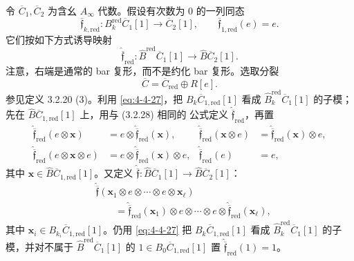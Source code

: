 令 $\overline C_1,\overline C_2$ 为含幺 $A_\infty$ 代数。假设有次数为
$0$ 的一列同态
\[
 \overline{\mathfrak f}_{k,\mathrm{red}}\colon
 B_k^{\mathrm{red}}\overline C_1[1]
 \longrightarrow\overline C_2[1],
 \qquad
 \overline{\mathfrak f}_{1,\mathrm{red}}(e)=e.
\]
它们按如下方式诱导映射
\begin{equation}
 \widehat{\overline{\mathfrak f}}_{\mathrm{red}}\colon
 \widehat B^{\mathrm{red}}\overline C_1[1]
 \longrightarrow\widehat B\overline C_2[1].
\tag{4.4.26}\label{eq:4-4-26}
\end{equation}
注意，右端是通常的 bar 复形，而不是约化 bar 复形。选取分裂
\begin{equation}
 \overline C=\overline C_{\mathrm{red}}\oplus R[e].
\tag{4.4.27}\label{eq:4-4-27}
\end{equation}
参见定义 3.2.20 (3)。利用 \eqref{eq:4-4-27}，把
$B_k\overline C_{1,\mathrm{red}}[1]$ 看成
$\widehat B_k^{\mathrm{red}}\overline C_1[1]$ 的子模；先在
$\widehat B\overline C_{1,\mathrm{red}}[1]$ 上，用与 (3.2.28) 相同的
公式定义 $\widehat{\overline{\mathfrak f}}_{\mathrm{red}}$，再置
\[
 \begin{aligned}
 \widehat{\overline{\mathfrak f}}_{\mathrm{red}}
 (e\otimes\mathbf x)
 &=e\otimes
 \widehat{\overline{\mathfrak f}}_{\mathrm{red}}(\mathbf x),&
 \widehat{\overline{\mathfrak f}}_{\mathrm{red}}
 (\mathbf x\otimes e)
 &=\widehat{\overline{\mathfrak f}}_{\mathrm{red}}(\mathbf x)
 \otimes e,\\
 \widehat{\overline{\mathfrak f}}_{\mathrm{red}}
 (e\otimes\mathbf x\otimes e)
 &=e\otimes
 \widehat{\overline{\mathfrak f}}_{\mathrm{red}}(\mathbf x)
 \otimes e,&
 \widehat{\overline{\mathfrak f}}_{\mathrm{red}}(e)&=e,
 \end{aligned}
\]
其中 $\mathbf x\in\widehat B\overline C_{1,\mathrm{red}}[1]$。又定义
$\widehat{\overline{\mathfrak f}}\colon
\widehat B\overline C_1[1]\to\widehat B\overline C_2[1]$：
\begin{equation}
 \begin{aligned}
 &\widehat{\overline{\mathfrak f}}
 (\mathbf x_1\otimes e\otimes\cdots\otimes e\otimes\mathbf x_\ell)\\
 &\qquad=
 \widehat{\overline{\mathfrak f}}_{\mathrm{red}}(\mathbf x_1)
 \otimes e\otimes\cdots\otimes e\otimes
 \widehat{\overline{\mathfrak f}}_{\mathrm{red}}(\mathbf x_\ell),
 \end{aligned}
\tag{4.4.28}\label{eq:4-4-28}
\end{equation}
其中
$\mathbf x_i\in B_{k_i}\overline C_{1,\mathrm{red}}[1]$。仍用
\eqref{eq:4-4-27} 把
$B_k\overline C_{1,\mathrm{red}}[1]$ 看成
$\widehat B_k^{\mathrm{red}}\overline C_1[1]$ 的子模，并对不属于
$\widehat B^{\mathrm{red}}\overline C_1[1]$ 的
$1\in B_0\overline C_{1,\mathrm{red}}[1]$ 置
$\widehat{\overline{\mathfrak f}}_{\mathrm{red}}(1)=1$。

